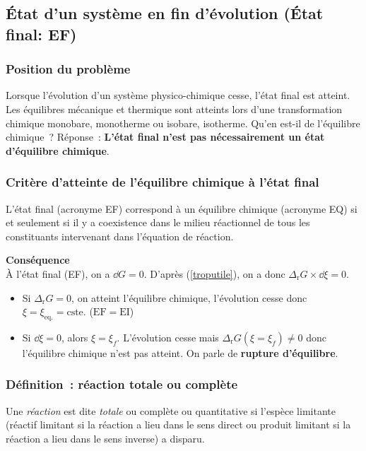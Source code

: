 \documentclass{article}
\let\oldref\ref
\renewcommand{\ref}[1]{(\oldref{#1})}
\newcommand{\Dr}{\Delta_{\mathrm{r}}}
\newcommand{\cste}{\text{cste}}
\newcommand{\EI}{\mathrm{EI}}
\newcommand{\EF}{\mathrm{EF}}
\newcommand{\equi}{\text{eq.}}
\begin{document}
\subsection{État d’un système en fin d’évolution (État final: EF)}
\subsubsection{Position du problème}
Lorsque l’évolution d’un système physico-chimique cesse, l’état final est atteint. Les équilibres mécanique et thermique sont atteints lors d’une transformation chimique monobare, monotherme ou isobare, isotherme. Qu’en est-il de l’équilibre chimique~? Réponse~: \textbf{L’état final n’est pas nécessairement un état d’équilibre chimique}.

\subsubsection{Critère d’atteinte de l’équilibre chimique à l’état final}
\begin{important}[Critère]
    L’état final (acronyme EF) correspond à un équilibre chimique (acronyme EQ) si et seulement si il y a coexistence dans le milieu réactionnel de tous les constituants intervenant dans l’équation de réaction.
\end{important}
\begin{tableau}
    \textbf{Conséquence}\\
    À l'état final (EF), on a $\dd{G}=0$. D'après \ref{troputile}, on a donc $\Dr G \times \dd{\xi}=0$.
    \begin{itemize}
        \item Si $\Dr G=0$, on atteint l'équilibre chimique, l'évolution cesse donc $\xi = \xi_\equi = \cste$. ($\EF=\EI$)
        \item Si $\dd{\xi} = 0$, alors $\xi = \xi_f$. L'évolution cesse mais $\Dr G(\xi=\xi_f) \neq 0$ donc l'équilibre chimique n'est pas atteint. On parle de \textbf{rupture d'équilibre}.
    \end{itemize}
\end{tableau}
\subsubsection{Définition~: réaction totale ou complète}
\begin{enonce}
    Une \textit{réaction} est dite \textit{totale} ou complète ou quantitative si l’espèce limitante (réactif limitant si la réaction a lieu dans le sens direct ou produit limitant si la réaction a lieu dans le sens inverse) a disparu.
\end{enonce}
\end{document}
